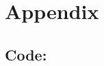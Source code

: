 \documentclass{article}
\begin{document}
   \tableofcontents


   \newpage


   
   
   
   

   \newpage

   \printbibliography

   \nocite{R}

   \section{Appendix}

      \subsection{Code:}

\end{document}
